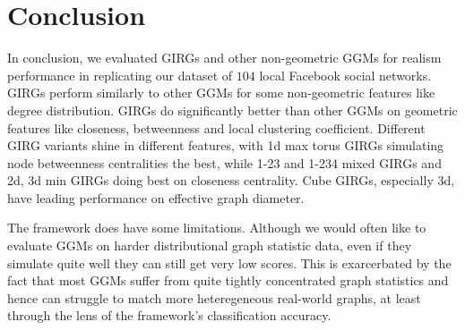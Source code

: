 






\section{Conclusion}
In conclusion, we evaluated GIRGs and other non-geometric GGMs for realism performance in replicating our dataset of $104$ local Facebook social networks. GIRGs perform similarly to other GGMs for some non-geometric features like degree distribution. GIRGs do significantly better than other GGMs on geometric features like closeness, betweenness and local clustering coefficient. Different GIRG variants shine in different features, with 1d max torus GIRGs simulating node betweenness centralities the best, while 1-23 and 1-234 mixed GIRGs and 2d, 3d min GIRGs doing best on closeness centrality. Cube GIRGs, especially 3d, have leading performance on effective graph diameter. 

The framework does have some limitations. Although we would often like to evaluate GGMs on harder distributional graph statistic data, even if they simulate quite well they can still get very low scores. This is exarcerbated by the fact that most GGMs suffer from quite tightly concentrated graph statistics and hence can struggle to match more heteregeneous real-world graphs, at least through the lens of the framework's classification accuracy.


